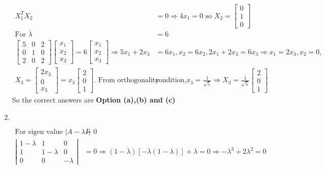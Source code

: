 \begin{enumerate}
\begin{answer}
\begin{align*}
			X_{1}^{T} X_{2}&=0 \Rightarrow 4 x_{1}=0\text{ so } X_{2}=\left[\begin{array}{l}0 \\ 1 \\ 0\end{array}\right]\\
			\text{For }\lambda&=6\\
			\left[\begin{array}{lll}
			5 & 0 & 2 \\
			0 & 1 & 0 \\
			2 & 0 & 2
			\end{array}\right]\left[\begin{array}{l}
			x_{1} \\
			x_{2} \\
			x_{3}
			\end{array}\right]=6\left[\begin{array}{l}
			x_{1} \\
			x_{2} \\
			x_{3}
			\end{array}\right] \Rightarrow 5 x_{1}+2 x_{3}&=6 x_{1}, x_{2}=6 x_{2}, 2 x_{1}+2 x_{3}=6 x_{3} \Rightarrow x_{1}=2 x_{3}, x_{2}=0,\\
			X_{3}=\left[\begin{array}{c}2 x_{3} \\ 0 \\ x_{3}\end{array}\right]=x_{3}\left[\begin{array}{l}2 \\ 0 \\ 1\end{array}\right].\text{ From orthogonality }&\text{condition,} x_{3}=\frac{1}{\sqrt{5}} \Rightarrow X_{3}=\frac{1}{\sqrt{5}}\left[\begin{array}{l}2 \\ 0 \\ 1\end{array}\right]
		\end{align*}
		So the correct answers are \textbf{Option (a),(b) and (c)}
	\end{answer}
	\item $\left. \right. $	
	\begin{answer}
		\begin{align*}
		\text{For eigen value }|A-\lambda I|&=0\\
		\left|\begin{array}{ccc}1-\lambda & 1 & 0 \\ 1 & 1-\lambda & 0 \\ 0 & 0 & -\lambda\end{array}\right|&=0 \Rightarrow(1-\lambda)[-\lambda(1-\lambda)]+\lambda=0 \Rightarrow-\lambda^{3}+2 \lambda^{2}=0\\

\end{align*}
\end{answer}
\end{enumerate}

